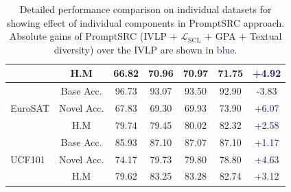 \begin{table}[!t]
{\begin{tabular}{lc|cccc|c}
                               & H.M            & 66.82 & 70.96    & 70.97 &71.75  & \textcolor{MidnightBlue}{{+4.92}}\\
\midrule
\multirow{3}{*}{EuroSAT}       & Base Acc.       & 96.73 & 93.07    & 93.50  &92.90 &  \textcolor{Bittersweet}{{-3.83}}\\
                               & Novel Acc.      & 67.83 & 69.30    & 69.93& 73.90   & \textcolor{MidnightBlue}{{+6.07}}\\
                               & H.M            & 79.74 & 79.45    & 80.02& 82.32   &  \textcolor{MidnightBlue}{{+2.58}}\\
\midrule
\multirow{3}{*}{UCF101}        & Base Acc.      & 85.93  & 87.10   & 87.07  &87.10   & \textcolor{MidnightBlue}{{+1.17}}\\
                               & Novel Acc.      & 74.17  & 79.73   & 79.80  &78.80  &  \textcolor{MidnightBlue}{{+4.63}}\\
                               & H.M            & 79.62  & 83.25   & 83.28 &82.74  & \textcolor{MidnightBlue}{{+3.12}}\\
\bottomrule
\end{tabular}%
}
    \caption{\small Detailed performance comparison on individual datasets for showing effect of individual components in PromptSRC approach. Absolute gains of PromptSRC (IVLP + $\mathcal{L}_\text{SCL}$ + GPA + Textual diversity) over the IVLP are shown in \textcolor{MidnightBlue}{blue}. }
    \label{tab_appendix:base_to_new}
\end{table}

